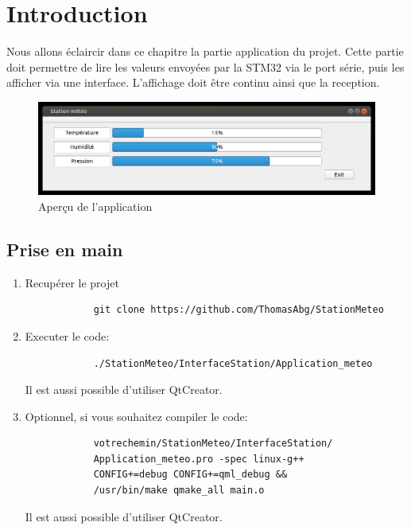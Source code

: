 \chapter{Introduction}
Nous allons éclaircir dans ce chapitre la partie application du projet. \newline
Cette partie doit permettre de lire les valeurs envoyées par la STM32 via le port série, puis les afficher via une interface. \newline 
L'affichage doit être continu ainsi que la reception.

\begin{figure}[H]
	\centering
    \includegraphics[width=\linewidth]{Figures/screen_app.png}
    \decoRule
    \caption[
    Aperçu de l'application]{
    Aperçu de l'application}
    \label{fig:Aperçu de l'application}
	\end{figure}
	
\section{Prise en main}

\begin{enumerate}
    \item Recupérer le projet 
        \begin{lstlisting}
            git clone https://github.com/ThomasAbg/StationMeteo
        \end{lstlisting}
    \item Executer le code:
        \begin{lstlisting}
            ./StationMeteo/InterfaceStation/Application_meteo
	    \end{lstlisting}
	    Il est aussi possible d'utiliser QtCreator.
	\item Optionnel, si vous souhaitez compiler le code: 
	    \begin{lstlisting}
        	votrechemin/StationMeteo/InterfaceStation/
        	Application_meteo.pro -spec linux-g++ 
        	CONFIG+=debug CONFIG+=qml_debug && 
        	/usr/bin/make qmake_all main.o
	    \end{lstlisting}
	    Il est aussi possible d'utiliser QtCreator.
\end{enumerate}	    



